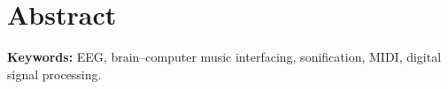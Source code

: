 \documentclass[../main.tex]{subfiles}
\begin{document}
\section*{Abstract}


\vspace{12pt}

\textbf{Keywords:} EEG, brain--computer music interfacing, sonification, MIDI, digital signal processing.
\end{document}

